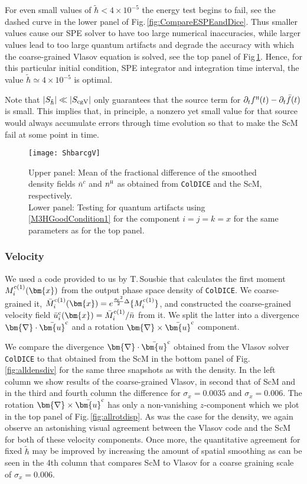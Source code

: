 \documentclass[twocolumn, nofootinbib, showpacs, superscriptaddress]{revtex4-1}
\renewcommand{\H}[0]{{\textsc{h}}}
\newcommand{\sigx}{{\sigma_{\! x}}}
\newcommand{\thbar}{\tilde\hbar}
\renewcommand{\c}[0]{{\rm{c}}}
\newcommand{\vx}[0]{\bm{x} }
\newcommand{\vu}[0]{\bm{u} }
\newcommand{\vnabla}[0]{\bm{\nabla} }
\begin{document}
For even small values of $\thbar < 4\times10^{-5}$ the energy test begins to fail, see the dashed curve in the lower panel of Fig.\,\ref{fig:CompareESPEandDice}.
Thus smaller values cause our SPE solver to have too large numerical inaccuracies, 
while larger values lead to too large quantum artifacts and degrade the accuracy with which the coarse-grained Vlasov equation is solved, 
see the top panel of Fig\,\ref{fig:ShbarcgV}.
Hence, for this particular initial condition, SPE integrator and integration time interval, the value $\thbar \simeq 4\times10^{-5}$ is optimal.
 

Note that $|S_{\thbar}| \ll |S_{\rm cg V}|$ only guarantees that the source term for $\partial_t f^\H(t) - \partial_t \bar{f}(t)$ is small. This 
implies that, in principle, a nonzero yet small value for that source would always accumulate errors through  time evolution so that to make the ScM fail at some point in time. 


\begin{figure}[t]
    \centering
    \texttt{[image: ShbarcgV]}
    \caption{Upper panel:  Mean of the fractional difference of the smoothed density fields $\bar n^c$ and $n^\H$ as obtained from \texttt{ColDICE} and the ScM, respectively.
\\
  Lower panel: Testing for quantum artifacts using \eqref{M3HGoodCondition1} for the component $i=j=k=x$
 for the same parameters as for the top panel.}
    \label{fig:ShbarcgV}
\end{figure} 



\subsubsection{Velocity}
We used a code provided to us by T.\,Sousbie that calculates  the first moment $M^{\c(1)}_i(\vx)$ from the output phase space density of \texttt{ColDICE}.
We coarse-grained it, $\bar M^{\c(1)}_i(\vx) = e^{\frac{\sigx^2}{2} \Delta} \{ M^{\c(1)}_i \}$, and constructed
 the coarse-grained velocity field  $\bar u^\c_i(\vx) = \bar M^{\c(1)}_i/ \bar n$ from it.
We split the latter into a divergence $\vnabla \cdot \bar {\vu}^\c$ and a rotation $\vnabla \times \bar {\vu}^\c$ component.

We compare the divergence $\vnabla \cdot \bar {\vu}^\c$  obtained from the Vlasov solver \texttt{ColDICE}
 to that obtained from the ScM in the bottom panel of Fig.\,\ref{fig:alldensdiv} for the same three snapshots as with the density.
In the left column we show results of the coarse-grained Vlasov, in second that of ScM and in the third and fourth column the difference for 
$\sigx=0.0035$ and $\sigx=0.006$.
The rotation $\vnabla \times \bar {\vu}^\c$ has only a non-vanishing $z$-component  which we plot in the top panel of Fig.\,\ref{fig:allrotdisp}.
As was the case for the density, we again observe an astonishing visual agreement between the Vlasov code and the ScM for both 
of these velocity components.
Once more, the quantitative agreement for fixed $\thbar$ may be improved by increasing the amount of spatial smoothing as
 can be seen in the 4th column that compares ScM to Vlasov for a coarse graining scale of $\sigx=0.006$.
\end{document}
